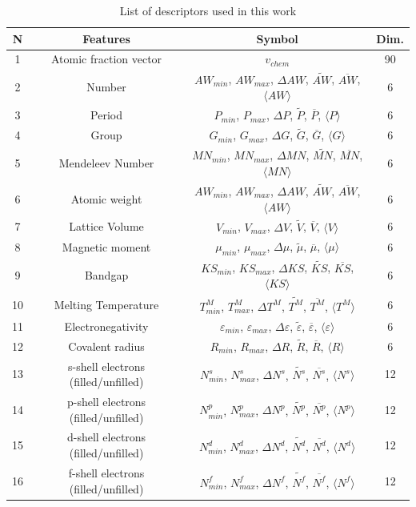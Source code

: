 \begin{table}[H]

\centering
\caption{List of descriptors used in this work}
\begin{tabular}{|c|c|c|c|}
\hline 
N & Features & Symbol & Dim. \\ 
\hline 
1 & Atomic fraction vector & $v_{chem}$ & 90 \\ 
2 & Number & $AW_{min}$,  $AW_{max}$,  $\Delta AW$,  $\widetilde{AW}$,  $\overline{AW}$,  $\langle AW \rangle$ & 6 \\ 
3 & Period & $P_{min}$, $P_{max}$,  $\Delta P$,  $\widetilde{P}$,  $\overline{P}$,  $\langle P \rangle$ & 6 \\ 
4 & Group & $G_{min}$, $G_{max}$,  $\Delta G$,  $\widetilde{G}$,  $\overline{G}$,  $\langle G \rangle$ & 6 \\ 
5 & Mendeleev Number & $MN_{min}$, $MN_{max}$,  $\Delta MN$,  $\widetilde{MN}$,  $\overline{MN}$,  $\langle MN \rangle$ & 6 \\ 
6 & Atomic weight & $AW_{min}$, $AW_{max}$,  $\Delta AW$,  $\widetilde{AW}$,  $\overline{AW}$,  $\langle AW \rangle$ & 6 \\ 
7 & Lattice Volume & $V_{min}$, $V_{max}$,  $\Delta V$,  $\widetilde{V}$,  $\overline{V}$,  $\langle V \rangle$ & 6 \\ 
8 & Magnetic moment & $\mu_{min}$, $\mu_{max}$,  $\Delta \mu$,  $\widetilde{\mu}$,  $\overline{\mu}$,  $\langle \mu \rangle$ & 6 \\ 
9 & Bandgap & $KS_{min}$, $KS_{max}$,  $\Delta KS$,  $\widetilde{KS}$,  $\overline{KS}$,  $\langle KS \rangle$ & 6 \\ 
10 & Melting Temperature & $T^M_{min}$, $T^M_{max}$,  $\Delta T^M$,  $\widetilde{T^M}$,  $\overline{T^M}$,  $\langle T^M \rangle$ & 6 \\ 
11 & Electronegativity & $\varepsilon_{min}$, $\varepsilon_{max}$,  $\Delta \varepsilon$,  $\widetilde{\varepsilon}$,  $\overline{\varepsilon}$,  $\langle \varepsilon \rangle$ & 6 \\ 
12 & Covalent radius & $R_{min}$, $R_{max}$,  $\Delta R$,  $\widetilde{R}$,  $\overline{R}$,  $\langle R \rangle$ & 6 \\ 
13 & s-shell electrons (filled/unfilled) & $N^s_{min}$, $N^s_{max}$,  $\Delta N^s$,  $\widetilde{N^s}$,  $\overline{N^s}$,  $\langle N^s \rangle$ & 12 \\ 
14 & p-shell electrons (filled/unfilled) & $N^p_{min}$, $N^p_{max}$,  $\Delta N^p$,  $\widetilde{N^p}$,  $\overline{N^p}$,  $\langle N^p \rangle$ & 12 \\ 
15 & d-shell electrons (filled/unfilled) & $N^d_{min}$, $N^d_{max}$,  $\Delta N^d$,  $\widetilde{N^d}$,  $\overline{N^d}$,  $\langle N^d \rangle$ & 12 \\ 
16 & f-shell electrons (filled/unfilled) & $N^f_{min}$, $N^f_{max}$,  $\Delta N^f$,  $\widetilde{N^f}$,  $\overline{N^f}$,  $\langle N^f \rangle$ & 12 \\ 
\hline 
\end{tabular} 
\end{table}


